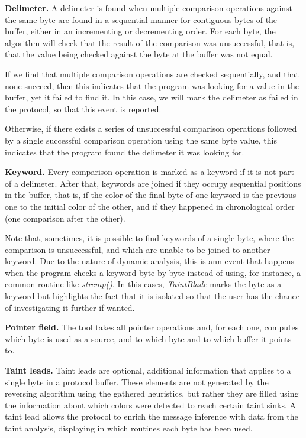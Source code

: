 \documentclass[conference]{IEEEtran}
\begin{document}
\textbf{Delimeter.} A delimeter is found when multiple comparison operations against the same byte 
are found in a sequential manner for contiguous bytes of the buffer, either in an incrementing 
or decrementing order. For each byte, the algorithm will check that the result of the comparison
was unsuccessful, that is, that the value being checked against the byte at the buffer was not equal.

If we find that multiple comparison operations are checked sequentially, and that none succeed, then this
indicates that the program was looking for a value in the buffer, yet it failed to find it. In this case,
we will mark the delimeter as failed in the protocol, so that this event is reported. 

Otherwise, if there exists a series of unsuccessful comparison operations followed by a single successful comparison
operation using the same byte value, this indicates that the program found the delimeter it was looking for.

\textbf{Keyword.} Every comparison operation is marked as a keyword if it is not part of a delimeter. After that, 
keywords are joined if they occupy sequential positions in the buffer, that is, if the color of the final byte of
one keyword is the previous one to the initial color of the other, and if they happened in chronological order
(one comparison after the other).

Note that, sometimes, it is possible to find keywords of a single byte, where the comparison is unsuccessful, and which are 
unable to be joined to another keyword. Due to the nature of dynamic analysis, this is ann event that happens when
the program checks a keyword byte by byte instead of using, for instance, a common routine like \textit{strcmp()}.  
In this cases, \textit{TaintBlade} marks the byte as a keyword but highlights the fact that it is isolated so
that the user has the chance of investigating it further if wanted.

\textbf{Pointer field.} The tool takes all pointer operations and, for each one, computes which byte is used as a source,
and to which byte and to which buffer it points to.

\textbf{Taint leads.} Taint leads are optional, additional information that applies to a single byte in a protocol buffer.
These elements are not generated by the reversing algorithm using the gathered heuristics, but rather 
they are filled using the information about which colors were detected to reach certain taint sinks.
A taint lead allows the protocol to enrich the message inference with data from the taint analysis, 
displaying in which routines each byte has been used.
\end{document}
